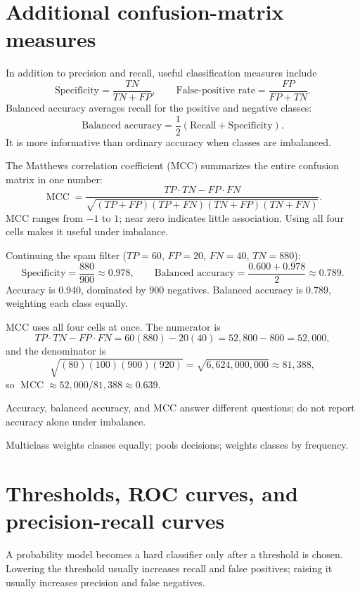 \section{Additional confusion-matrix measures}

In addition to precision and recall, useful classification measures include
\[
  \text{Specificity}=\frac{TN}{TN+FP},
  \qquad
  \text{False-positive rate}=\frac{FP}{FP+TN}.
\]
Balanced accuracy averages recall for the positive and negative classes:
\[
  \text{Balanced accuracy}
  =\frac{1}{2}
  (\text{Recall}+\text{Specificity}).
\]
It is more informative than ordinary accuracy when classes are imbalanced.

The Matthews correlation coefficient (MCC) summarizes the entire confusion matrix in one number:
\[
  \operatorname{MCC}
  =\frac{TP\cdot TN-FP\cdot FN}
  {\sqrt{(TP+FP)(TP+FN)(TN+FP)(TN+FN)}}.
\]
MCC ranges from $-1$ to $1$; near zero indicates little association. Using all four cells makes it useful under imbalance.

\begin{workedexample}
Continuing the spam filter ($TP=60$, $FP=20$, $FN=40$, $TN=880$):
\[
  \text{Specificity}=\frac{880}{900}\approx 0.978,
  \qquad
  \text{Balanced accuracy}=\frac{0.600+0.978}{2}\approx 0.789.
\]
Accuracy is $0.940$, dominated by 900 negatives. Balanced accuracy is $0.789$, weighting each class equally.

MCC uses all four cells at once. The numerator is
\[
  TP\cdot TN-FP\cdot FN=60(880)-20(40)=52{,}800-800=52{,}000,
\]
and the denominator is
\[
  \sqrt{(80)(100)(900)(920)}=\sqrt{6{,}624{,}000{,}000}\approx 81{,}388,
\]
so $\operatorname{MCC}\approx 52{,}000/81{,}388\approx 0.639$.

Accuracy, balanced accuracy, and MCC answer different questions; do not report accuracy alone under imbalance.
\end{workedexample}

Multiclass  weights classes equally;  pools decisions;  weights classes by frequency.

\section{Thresholds, ROC curves, and precision-recall curves}

A probability model becomes a hard classifier only after a threshold is chosen. Lowering the threshold usually increases recall and false positives; raising it usually increases precision and false negatives.

